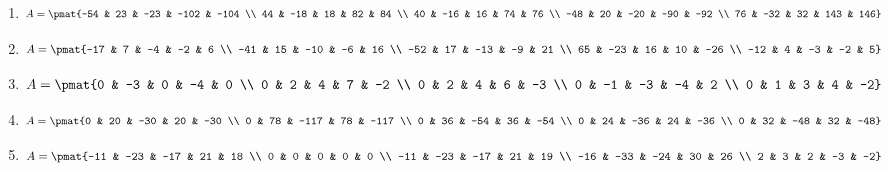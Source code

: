 \begin{enumerate}
\item

\begin{align*}
A = \pmat{-54 & 23 & -23 & -102 & -104 \\ 44 & -18 & 18 & 82 & 84 \\ 40 & -16 & 16 & 74 & 76 \\ -48 & 20 & -20 & -90 & -92 \\ 76 & -32 & 32 & 143 & 146}
\end{align*}

\item

\begin{align*}
A = \pmat{-17 & 7 & -4 & -2 & 6 \\ -41 & 15 & -10 & -6 & 16 \\ -52 & 17 & -13 & -9 & 21 \\ 65 & -23 & 16 & 10 & -26 \\ -12 & 4 & -3 & -2 & 5}
\end{align*}

\item

\begin{align*}
A = \pmat{0 & -3 & 0 & -4 & 0 \\ 0 & 2 & 4 & 7 & -2 \\ 0 & 2 & 4 & 6 & -3 \\ 0 & -1 & -3 & -4 & 2 \\ 0 & 1 & 3 & 4 & -2}
\end{align*}

\item

\begin{align*}
A = \pmat{0 & 20 & -30 & 20 & -30 \\ 0 & 78 & -117 & 78 & -117 \\ 0 & 36 & -54 & 36 & -54 \\ 0 & 24 & -36 & 24 & -36 \\ 0 & 32 & -48 & 32 & -48}
\end{align*}

\item

\begin{align*}
A = \pmat{-11 & -23 & -17 & 21 & 18 \\ 0 & 0 & 0 & 0 & 0 \\ -11 & -23 & -17 & 21 & 19 \\ -16 & -33 & -24 & 30 & 26 \\ 2 & 3 & 2 & -3 & -2}
\end{align*}


\end{enumerate}
